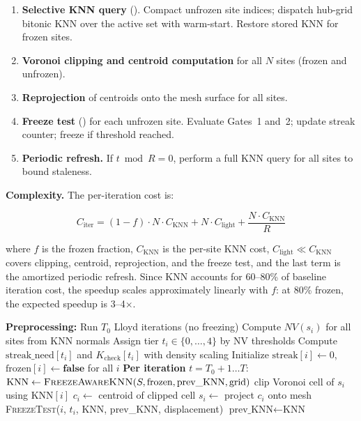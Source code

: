\begin{enumerate}
    \item \textbf{Selective KNN query} (). Compact unfrozen site indices; dispatch hub-grid bitonic KNN over the active set with warm-start. Restore stored KNN for frozen sites.
    \item \textbf{Voronoi clipping and centroid computation} for all $N$ sites (frozen and unfrozen).
    \item \textbf{Reprojection} of centroids onto the mesh surface for all sites.
    \item \textbf{Freeze test} () for each unfrozen site. Evaluate Gates~1 and~2; update streak counter; freeze if threshold reached.
    \item \textbf{Periodic refresh.} If $t \bmod R = 0$, perform a full KNN query for all sites to bound staleness.
\end{enumerate}

\textbf{Complexity.} The per-iteration cost is:

$$C_{\mathrm{iter}} = (1 - f) \cdot N \cdot C_{\mathrm{KNN}} + N \cdot C_{\mathrm{light}} + \frac{N \cdot C_{\mathrm{KNN}}}{R}$$

where $f$ is the frozen fraction, $C_{\mathrm{KNN}}$ is the per-site KNN cost, $C_{\mathrm{light}} \ll C_{\mathrm{KNN}}$ covers clipping, centroid, reprojection, and the freeze test, and the last term is the amortized periodic refresh. Since KNN accounts for 60--80\% of baseline iteration cost, the speedup scales approximately linearly with $f$: at 80\% frozen, the expected speedup is 3--4$\times$.

\begin{algorithm}[t]
\caption{Complete Pipeline}
\label{alg:complete_pipeline}
\begin{algorithmic}[1]
\Statex \textbf{Preprocessing:}
\State Run $T_0$ Lloyd iterations (no freezing)
\State Compute $NV(s_i)$ for all sites from KNN normals
\State Assign tier $t_i \in \{0,\ldots,4\}$ by NV thresholds
\State Compute $\text{streak\_need}[t_i]$ and $K_{\text{check}}[t_i]$ with density scaling
\State Initialize $\text{streak}[i] \gets 0$, $\text{frozen}[i] \gets \textbf{false}$ for all $i$
\Statex
\Statex \textbf{Per iteration} $t = T_0+1 \ldots T$:
\State $\text{KNN} \gets \textsc{FreezeAwareKNN}(S, \text{frozen}, \text{prev\_KNN}, \text{grid})$ 
 
    \State clip Voronoi cell of $s_i$ using $\text{KNN}[i]$
    \State $c_i \gets$ centroid of clipped cell
    \State $s_i \gets$ project $c_i$ onto mesh
\EndFor
{} 
    \State \textsc{FreezeTest}($i$, $t_i$, KNN, prev\_KNN, displacement)
\EndFor
\State $\text{prev\_KNN} \gets \text{KNN}$
\end{algorithmic}
\end{algorithm}

